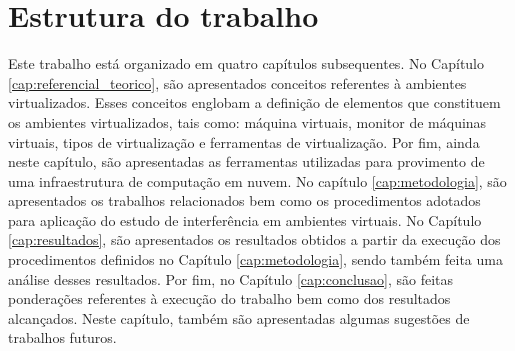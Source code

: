 \section{Estrutura do trabalho}
Este trabalho está organizado em quatro capítulos subsequentes. No Capítulo \ref{cap:referencial_teorico}, são apresentados conceitos referentes à ambientes virtualizados. Esses conceitos englobam a definição de elementos que constituem os ambientes virtualizados, tais como: máquina virtuais, monitor de máquinas virtuais, tipos de virtualização e ferramentas de virtualização. Por fim, ainda neste capítulo, são apresentadas as ferramentas utilizadas para provimento de uma infraestrutura de computação em nuvem. No capítulo \ref{cap:metodologia}, são apresentados os trabalhos relacionados bem como os procedimentos adotados para aplicação do estudo de interferência em ambientes virtuais. No Capítulo \ref{cap:resultados}, são apresentados os resultados obtidos a partir da execução dos procedimentos definidos no Capítulo \ref{cap:metodologia}, sendo também feita uma análise desses resultados. Por fim, no Capítulo \ref{cap:conclusao}, são feitas ponderações referentes à execução do trabalho bem como dos resultados alcançados. Neste capítulo, também são apresentadas algumas sugestões de trabalhos futuros.




